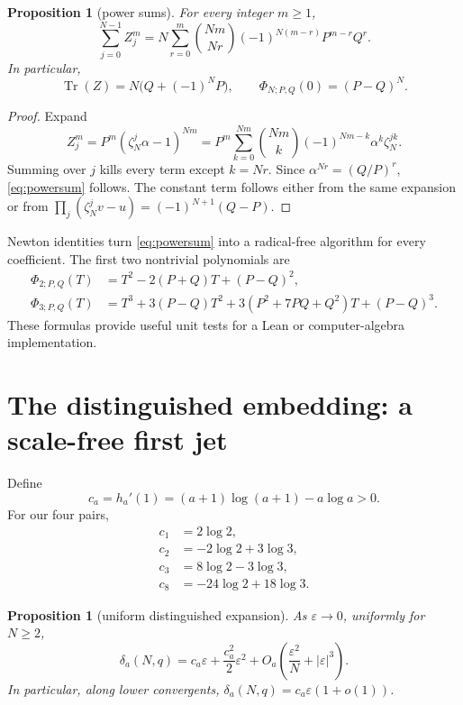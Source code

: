 \documentclass[11pt]{article}
\newtheorem{proposition}[theorem]{Proposition}
\theoremstyle{definition}
\theoremstyle{remark}
\DeclareMathOperator{\Tr}{Tr}
\newcommand{\eps}{\varepsilon}
\begin{document}
\begin{proposition}[power sums]\label{prop:powersums}
For every integer \(m\ge1\),
\begin{equation}\label{eq:powersum}
\sum_{j=0}^{N-1} Z_j^m
=N\sum_{r=0}^{m}
\binom{Nm}{Nr}(-1)^{N(m-r)}P^{m-r}Q^r.
\end{equation}
In particular,
\[
\Tr(Z)=N\bigl(Q+(-1)^NP\bigr),
\qquad \Phi_{N;P,Q}(0)=(P-Q)^N.
\]
\end{proposition}

\begin{proof}
Expand
\[
Z_j^m=P^m(\zeta_N^j\alpha-1)^{Nm}
=P^m\sum_{k=0}^{Nm}\binom{Nm}{k}(-1)^{Nm-k}\alpha^k\zeta_N^{jk}.
\]
Summing over \(j\) kills every term except \(k=Nr\).  Since \(\alpha^{Nr}=(Q/P)^r\), \eqref{eq:powersum} follows.  The constant term follows either from the same expansion or from
\(\prod_j(\zeta_N^jv-u)=(-1)^{N+1}(Q-P)\).
\end{proof}

Newton identities turn \eqref{eq:powersum} into a radical-free algorithm for every coefficient.  The first two nontrivial polynomials are
\begin{align*}
\Phi_{2;P,Q}(T)
 &=T^2-2(P+Q)T+(P-Q)^2,\\
\Phi_{3;P,Q}(T)
 &=T^3+3(P-Q)T^2+3(P^2+7PQ+Q^2)T+(P-Q)^3.
\end{align*}
These formulas provide useful unit tests for a Lean or computer-algebra implementation.

\section{The distinguished embedding: a scale-free first jet}

Define
\begin{equation}\label{eq:ca}
c_a=h_a'(1)=(a+1)\log(a+1)-a\log a>0.
\end{equation}
For our four pairs,
\begin{align*}
c_1&=2\log2,\\
c_2&=-2\log2+3\log3,\\
c_3&=8\log2-3\log3,\\
c_8&=-24\log2+18\log3.
\end{align*}

\begin{proposition}[uniform distinguished expansion]\label{prop:distinguished}
As \(\eps\to0\), uniformly for \(N\ge2\),
\begin{equation}\label{eq:dist-expansion}
\delta_a(N,q)
=c_a\eps+\frac{c_a^2}{2}\eps^2
+O_a\!\left(\frac{\eps^2}{N}+|\eps|^3\right).
\end{equation}
In particular, along lower convergents,
\(\delta_a(N,q)=c_a\eps(1+o(1))\).
\end{proposition}
\end{document}
